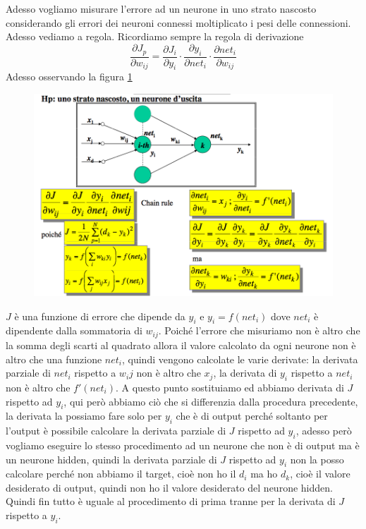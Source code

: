 \noindent Adesso vogliamo misurare l'errore ad un neurone in uno strato nascosto considerando gli errori dei neuroni connessi moltiplicato i pesi delle connessioni. Adesso vediamo a regola. Ricordiamo sempre la regola di derivazione
\begin{equation}
\frac{\partial J_p}{\partial w_{ij}} = \frac{\partial J_i}{\partial y_i} \cdot \frac{\partial y_i}{\partial net_i} \cdot \frac{\partial net_i}{\partial w_{ij} }
\end{equation}
Adesso osservando la figura \ref{hp1}
\begin{figure}
\centering
\includegraphics[scale=0.5]{img/hp.png}
\caption{}
\label{hp1}
\end{figure}
$J$ è una funzione di errore che dipende da $y_i$ e $y_i = f(net_i)$ dove $net_i$ è dipendente dalla sommatoria di $w_{ij}$. 
Poiché l'errore che misuriamo non è altro che la somma degli scarti al quadrato allora il valore calcolato da ogni neurone non è altro che una funzione $net_i$, quindi vengono calcolate le varie derivate: la derivata parziale di $net_i$ rispetto a $w_ij$ non è altro che $x_j$, la derivata di $y_i$ rispetto a $net_i$ non è altro che $f'(net_i)$. A questo punto sostituiamo ed abbiamo derivata di $J$ rispetto ad $y_i$, qui però abbiamo ciò che si differenzia dalla procedura precedente, la derivata la possiamo fare solo per $y_i$ che è di output perché soltanto per l'output è possibile calcolare la derivata parziale di $J$ rispetto ad $y_i$, adesso però vogliamo eseguire lo stesso procedimento ad un neurone che non è di output ma è un neurone hidden, quindi la derivata parziale di $J$ rispetto ad $y_i$ non la posso calcolare perché non abbiamo il target, cioè non ho il $d_i$ ma ho $d_k$, cioè il valore desiderato di output, quindi non ho il valore desiderato del neurone hidden. Quindi fin tutto è uguale  al procedimento di prima tranne per la derivata di $J$ rispetto a $y_i$. 
